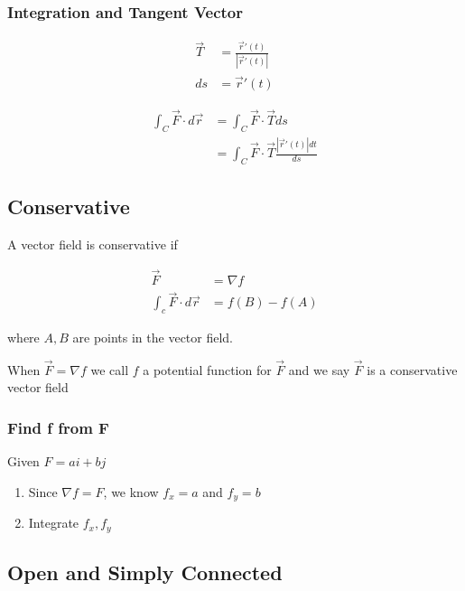     \subsubsection{Integration and Tangent Vector}

      \begin{align*}
        \vec{T} &= \frac{\vec{r}'\left( t \right)}{\left| \vec{r}'\left( t \right) \right|} \\
        ds &= \vec{r}'\left( t \right)
      \end{align*}

      \begin{align*}
        \int_{C} \vec{F} \cdot d \vec{r}
        &= \int_{C} \vec{F} \cdot \vec{T} ds \\
        &= \int_{C} \vec{F} \cdot \vec{T} \frac{\left| \vec{r}'\left( t \right) \right| dt}{ds}
      \end{align*}

  \subsection{Conservative}

    A vector field is conservative if

    \begin{align}
      \vec{F} &= \nabla f \\
      \int_{c} \vec{F} \cdot d \vec{r} &= f\left( B \right) - f\left( A \right)
    \end{align}

    where $ A, B $ are points in the vector field.

    When $ \vec{F} = \nabla f $ we call $ f $ a potential function
    for $ \vec{F} $ and we say $ \vec{F} $ is a conservative vector field

    \subsubsection{Find f from F}

      Given $ F = ai + bj $

      \begin{enumerate}
        \item Since $ \nabla f = F $, we know $ f_{x} = a $  and
        $ f_{y} = b $
        \item Integrate $ f_{x}, f_{y} $
      \end{enumerate}

  \subsection{Open and Simply Connected}

